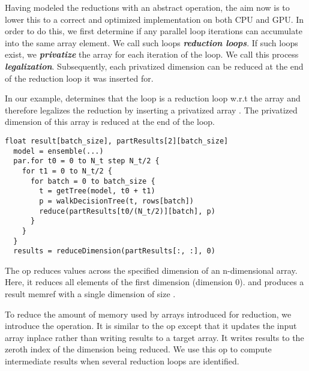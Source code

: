 Having modeled the reductions with an abstract operation, the 
aim now is to lower this to a correct and optimized 
implementation on both CPU and GPU. In order to do this, we 
first determine if any parallel loop iterations can accumulate 
into the same array element. We call such loops 
\emph{\textbf{reduction loops}}. If such loops exist, we 
\textbf{\emph{privatize}} the array for each iteration of the
loop. We call this process \textbf{\emph{legalization}}.
Subsequently, each privatized dimension 
can be reduced at the end of the reduction loop it was inserted for. 

In our example, \Treebeard{} determines that the  loop is a reduction 
loop w.r.t the  array and therefore legalizes 
the reduction by inserting a privatized array 
. The privatized dimension of this array 
is reduced at the end of the  loop.

\begin{lstlisting}[style=c++]
  float result[batch_size], partResults[2][batch_size]
  model = ensemble(...) 
  par.for t0 = 0 to N_t step N_t/2 {
    for t1 = 0 to N_t/2 {
      for batch = 0 to batch_size {
        t = getTree(model, t0 + t1) 
        p = walkDecisionTree(t, rows[batch])
        reduce(partResults[t0/(N_t/2)][batch], p)
      }
    }
  }
  results = reduceDimension(partResults[:, :], 0)
\end{lstlisting}

The op  reduces values across the specified
dimension of an n-dimensional array. Here, 
it reduces all elements of the first dimension (dimension 0). 
and produces a result memref with a single dimension of size .

To reduce the amount of memory used by arrays introduced for reduction,
we introduce the  operation. It is similar to the 
 op except that it updates the input array inplace
rather than writing results to a target array. It writes results to the 
zeroth index of the dimension being reduced. We use this op to 
compute intermediate results when several reduction loops are identified.

  
